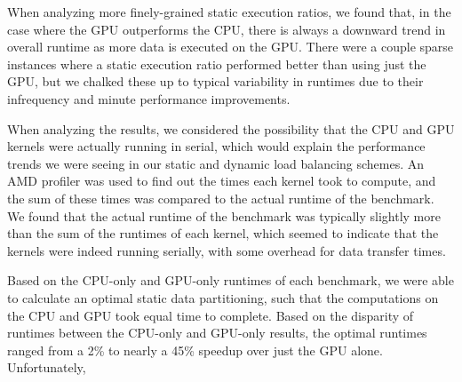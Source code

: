 \documentclass[journal]{IEEEtran}
\begin{document}
When analyzing more finely-grained static execution ratios, we found that, in the case
where the GPU outperforms the CPU, there is always a downward trend in overall runtime
as more data is executed on the GPU.  There were a couple sparse instances where a static
execution ratio performed better than using just the GPU, but we chalked these up to
typical variability in runtimes due to their infrequency and minute performance improvements.

When analyzing the results, we considered the possibility that the CPU and GPU kernels were
actually running in serial, which would explain the performance trends we were seeing in our
static and dynamic load balancing schemes.  An AMD profiler was used to find out the times each
kernel took to compute, and the sum of these times was compared to the actual runtime of the
benchmark.  We found that the actual runtime of the benchmark was typically slightly more than
the sum of the runtimes of each kernel, which seemed to indicate that the kernels were indeed
running serially, with some overhead for data transfer times.

Based on the CPU-only and GPU-only runtimes of each benchmark, we were able to calculate an
optimal static data partitioning, such that the computations on the CPU and GPU took equal
time to complete.  Based on the disparity of runtimes between the CPU-only and GPU-only
results, the optimal runtimes ranged from a 2\% to nearly a 45\% speedup over just the GPU
alone.  Unfortunately,
\end{document}
